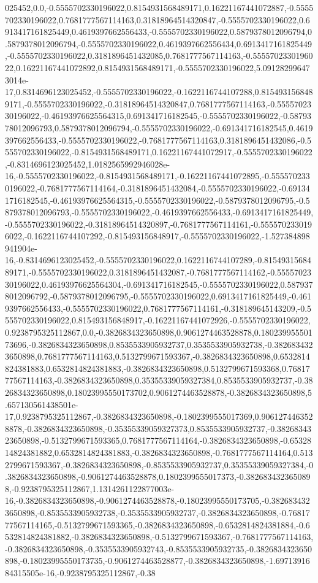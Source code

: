 025452,0.0,-0.5555702330196022,0.8154931568489171,0.16221167441072887,-0.5555702330196022,0.7681777567114163,0.31818964514320847,-0.5555702330196022,0.6913417161825449,0.4619397662556433,-0.5555702330196022,0.5879378012096794,0.5879378012096794,-0.5555702330196022,0.4619397662556434,0.6913417161825449,-0.5555702330196022,0.3181896451432085,0.7681777567114163,-0.5555702330196022,0.16221167441072892,0.8154931568489171,-0.5555702330196022,5.091282996473014e-17,0.8314696123025452,-0.5555702330196022,-0.1622116744107288,0.8154931568489171,-0.5555702330196022,-0.31818964514320847,0.7681777567114163,-0.5555702330196022,-0.46193976625564315,0.691341716182545,-0.5555702330196022,-0.5879378012096793,0.5879378012096794,-0.5555702330196022,-0.691341716182545,0.4619397662556433,-0.5555702330196022,-0.7681777567114163,0.3181896451432086,-0.5555702330196022,-0.8154931568489171,0.16221167441072917,-0.5555702330196022,-0.8314696123025452,1.0182565992946028e-16,-0.5555702330196022,-0.8154931568489171,-0.16221167441072895,-0.5555702330196022,-0.7681777567114164,-0.3181896451432084,-0.5555702330196022,-0.691341716182545,-0.46193976625564315,-0.5555702330196022,-0.5879378012096795,-0.5879378012096793,-0.5555702330196022,-0.4619397662556433,-0.6913417161825449,-0.5555702330196022,-0.31818964514320897,-0.7681777567114161,-0.5555702330196022,-0.1622116744107292,-0.815493156848917,-0.5555702330196022,-1.527384898941904e-16,-0.8314696123025452,-0.5555702330196022,0.1622116744107289,-0.8154931568489171,-0.5555702330196022,0.3181896451432087,-0.7681777567114162,-0.5555702330196022,0.46193976625564304,-0.691341716182545,-0.5555702330196022,0.5879378012096792,-0.5879378012096795,-0.5555702330196022,0.6913417161825449,-0.4619397662556433,-0.5555702330196022,0.7681777567114161,-0.318189645143209,-0.5555702330196022,0.815493156848917,-0.16221167441072926,-0.5555702330196022,0.9238795325112867,0.0,-0.3826834323650898,0.9061274463528878,0.18023995550173696,-0.3826834323650898,0.8535533905932737,0.3535533905932738,-0.3826834323650898,0.7681777567114163,0.5132799671593367,-0.3826834323650898,0.6532814824381883,0.6532814824381883,-0.3826834323650898,0.5132799671593368,0.7681777567114163,-0.3826834323650898,0.35355339059327384,0.8535533905932737,-0.3826834323650898,0.18023995550173702,0.9061274463528878,-0.3826834323650898,5.657130561438501e-17,0.9238795325112867,-0.3826834323650898,-0.1802399555017369,0.9061274463528878,-0.3826834323650898,-0.35355339059327373,0.8535533905932737,-0.3826834323650898,-0.5132799671593365,0.7681777567114164,-0.3826834323650898,-0.6532814824381882,0.6532814824381883,-0.3826834323650898,-0.7681777567114164,0.5132799671593367,-0.3826834323650898,-0.8535533905932737,0.35355339059327384,-0.3826834323650898,-0.9061274463528878,0.1802399555017373,-0.3826834323650898,-0.9238795325112867,1.1314261122877003e-16,-0.3826834323650898,-0.9061274463528878,-0.18023995550173705,-0.3826834323650898,-0.8535533905932738,-0.3535533905932737,-0.3826834323650898,-0.7681777567114165,-0.5132799671593365,-0.3826834323650898,-0.6532814824381884,-0.6532814824381882,-0.3826834323650898,-0.5132799671593367,-0.7681777567114163,-0.3826834323650898,-0.3535533905932743,-0.8535533905932735,-0.3826834323650898,-0.18023995550173735,-0.9061274463528877,-0.3826834323650898,-1.6971391684315505e-16,-0.9238795325112867,-0.38
